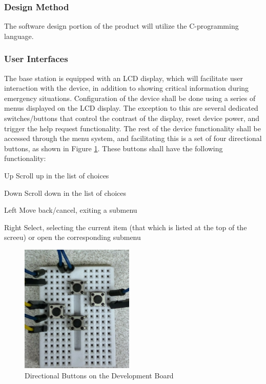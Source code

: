 \documentclass[journal,compsoc]{IEEEtran}
\begin{document}
\subsubsection{Design Method}
The software design portion of the product will utilize the C-programming language.

\subsubsection{User Interfaces}
The base station is equipped with an LCD display, which will facilitate user interaction with the device, in addition to showing critical information during emergency situations. Configuration of the device shall be done using a series of menus displayed on the LCD display. The exception to this are several dedicated switches/buttons that control the contrast of the display, reset device power, and trigger the help request functionality. The rest of the device functionality shall be accessed through the menu system, and facilitating this is a set of four directional buttons, as shown in Figure \ref{dev buttons}. These buttons shall have the following functionality:

\begin{LaTeXdescription}
	\item[Up] Scroll up in the list of choices
    \item[Down] Scroll down in the list of choices
    \item[Left] Move back/cancel, exiting a submenu
    \item[Right] Select, selecting the current item (that which is listed at the top of the screeu) or open the corresponding submenu
\end{LaTeXdescription}

\begin{figure}
	\centering
	\includegraphics[width=0.48\textwidth]{dev_buttons.jpg}
    \caption{Directional Buttons on the Development Board}
    \label{dev buttons}
\end{figure}
\end{document}
